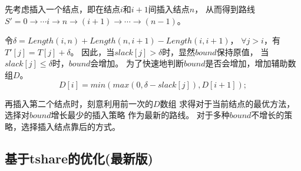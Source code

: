 \documentclass[hyperref,UTF8]{ctexart}
\theoremstyle{definition}
\theoremstyle{remark}
\numberwithin{equation}{subsection}
\begin{document}
先考虑插入一个结点，即在结点$i$和$i+1$间插入结点$n$，
从而得到路线$S' = 0 \rightarrow \cdots i \rightarrow n \rightarrow (i+1) \rightarrow \cdots \rightarrow (n-1)$。

令$\delta = Length(i,n) + Length(n,i+1) - Length(i,i+1)$，
$\forall j>i$，有$T'[j] = T[j] + \delta$。
因此，当$slack[j] > \delta$时，显然$bound$保持原值，
当$slack[j] \le \delta$时，$bound$会增加。
为了快速地判断$bound$是否会增加，增加辅助数组$D$。
\[
	D[i] = min(max(0,\delta-slack[j]), D[i+1]);
\]

再插入第二个结点时，刻意利用前一次的$D$数组
求得对于当前结点的最优方法，选择对$bound$增长最少的插入策略
作为最新的路线。
对于多种$bound$不增长的策略，选择插入结点靠后的方式。

\newpage
\subsection{基于tshare的优化(最新版)}
\end{document}

